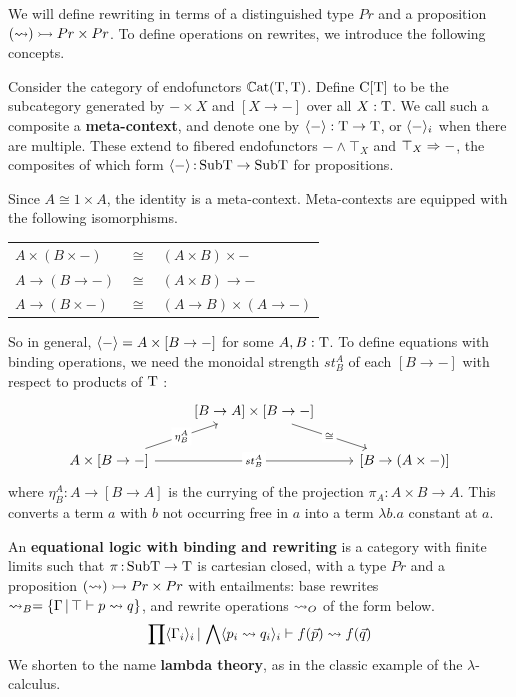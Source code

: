 \documentclass{article}
\begin{document}
We will define rewriting in terms of a distinguished type $Pr$ and a proposition $(\rightsquigarrow)\rightarrowtail Pr\times Pr$. To define operations on rewrites, we introduce the following concepts.

\begin{definition}
    Consider the category of endofunctors $\mathbb{C}\mathrm{at}(\mathrm{T},\mathrm{T})$. Define $\mathrm{C}[\mathrm{T}]$ to be the subcategory generated by $-\times X$ and $[X\to -]$ over all $X:\mathrm{T}$. We call such a composite a \textbf{meta-context}, and denote one by $\langle -\rangle:\mathrm{T}\to \mathrm{T}$, or $\langle -\rangle_i$ when there are multiple. These extend to fibered endofunctors $-\land \top_X$ and $\top_X\Rightarrow -$, the composites of which form $\langle -\rangle\,{:}\, \mathrm{SubT}\to \mathrm{SubT}$ for propositions.
\end{definition}

Since $A\cong 1\times A$, the identity is a meta-context. Meta-contexts are equipped with the following isomorphisms.
\begin{center}
    \renewcommand{\arraystretch}{1.2}
    \begin{tabular}{lcl}
        $A\times (B\times -)$ & $\cong$ & $(A\times B)\times -$\\
        $A\to (B\to -)$ & $\cong$ & $(A\times B)\to -$\\
        $A\to (B\times -)$ & $\cong$ & $(A\to B)\times (A\to -)$
    \end{tabular}
\end{center}
So in general, $\langle -\rangle= A\times [B\to -]$ for some $A,B:\mathrm{T}$. To define equations with binding operations, we need the monoidal strength $st_B^A$ of each $[B\to -]$ with respect to products of $\mathrm{T}$ \citep{strong}:
\[\begin{tikzcd}
	& {[B\to A]\times [B\to -]} \\
	{A\times [B\to -]} && {[B\to (A\times -)]}
	\arrow["\cong"{description}, from=1-2, to=2-3]
	\arrow["{\eta_B^A}"{description}, from=2-1, to=1-2]
	\arrow["{st_B^A}"{description}, from=2-1, to=2-3]
\end{tikzcd}\]
where $\eta_B^A:A\to [B\to A]$ is the currying of the projection $\pi_A:A\times B\to A$. This converts a term $a$ with $b$ not occurring free in $a$ into a term $\lambda b.a$ constant at $a$.

\begin{definition}
    An \textbf{equational logic with binding and rewriting} is a category with finite limits such that $\pi\,{:}\, \mathrm{SubT\to T}$ is cartesian closed, with a type $Pr$ and a proposition $(\rightsquigarrow)\rightarrowtail Pr\times Pr$ with entailments: base rewrites $\rightsquigarrow_B = \{\Gamma\,|\, \top\vdash p\rightsquigarrow q\}$, and rewrite operations $\rightsquigarrow_O$ of the form below.
    \[\prod \langle \Gamma_i\rangle_i\,|\, \bigwedge \langle p_i\rightsquigarrow q_i\rangle_i\vdash f(\vec{p})\rightsquigarrow f(\vec{q})\]
    We shorten to the name \textbf{lambda theory}, as in the classic example of the $\lambda$-calculus.
\end{definition}
\end{document}
